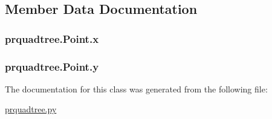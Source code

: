 \subsection{Member Data Documentation}
\subsubsection[{x}]{\setlength{\rightskip}{0pt plus 5cm}prquadtree.\+Point.\+x}\label{classprquadtree_1_1Point_a769eeb814487b26593281a720cc43813}
\subsubsection[{y}]{\setlength{\rightskip}{0pt plus 5cm}prquadtree.\+Point.\+y}\label{classprquadtree_1_1Point_acc50fd274155e9a89996263a7e9f20db}


The documentation for this class was generated from the following file\+:\begin{DoxyCompactItemize}
\item 
\hyperlink{prquadtree_8py}{prquadtree.\+py}\end{DoxyCompactItemize}
